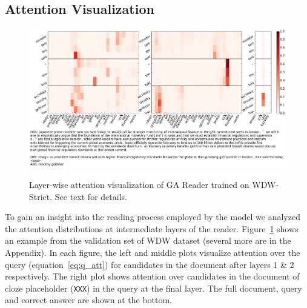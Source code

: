 \documentclass[11pt,a4paper]{article}
\begin{document}

\subsection{Attention Visualization}
\begin{figure}[t]
\centering
\caption{Layer-wise attention visualization of GA Reader trained on WDW-Strict. See text for details.}
\includegraphics[width=0.91\linewidth]{attention_plots/AFP_ENG_20090326_0419_question.png}
\label{fig:att_plots}
\end{figure}

To gain an insight into the reading process employed by the model we analyzed the attention distributions at intermediate layers of the reader.
Figure~\ref{fig:att_plots} shows an example from the validation set of WDW dataset (several more are in the Appendix).
In each figure, the left and middle plots visualize attention over the query (equation~\ref{eq:q_att}) for candidates in the document after layers 1 \& 2 respectively. The right plot shows attention over candidates in the document of cloze placeholder (\texttt{XXX}) in the query at the final layer.
The full document, query and correct answer are shown at the bottom.
\end{document}
